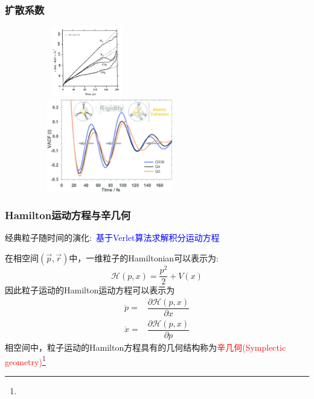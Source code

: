 \frame
{
	\frametitle{扩散系数}
\begin{figure}[h!]
\centering
\vspace*{-0.2in}
\includegraphics[height=1.2in,width=2.0in,viewport=0 0 350 300,clip]{Figures/MSD_O2-N2-CO2-CH4.png}\\
\includegraphics[height=1.6in,width=2.8in,viewport=0 0 230 160,clip]{Figures/The-velocity-autocorrelation-function-VACF-of-the-Al-atoms-showing-the-increase-of-rigidity of the local Al-coordination-for-G3-G4-and-G338-glasses.png}
\label{MSD-VACF}
\end{figure}
}


\begin{frame}
	\frametitle{\textrm{Hamilton}运动方程与辛几何}
	经典粒子随时间的演化:~\textcolor{blue}{基于\textrm{Verlet}算法求解积分运动方程}\\
	{\fontsize{7.2pt}{4.2pt}}

	在相空间$(\vec p,\vec r)$中，一维粒子的\textrm{Hamiltonian}可以表示为:
	\begin{displaymath}
		\mathcal{H}(p,x)=\dfrac{p^2}2+V(x)
	\end{displaymath}
	因此粒子运动的\textrm{Hamilton}运动方程可以表示为
	\begin{displaymath}
		\begin{aligned}
			\dot p=&\dfrac{\partial\mathcal{H}(p,x)}{\partial x}\\
			\dot x=&\dfrac{\partial\mathcal{H}(p,x)}{\partial p}
		\end{aligned}
	\end{displaymath}
	相空间中，粒子运动的\textrm{Hamilton}方程具有的几何结构称为\textcolor{red}{辛几何\textrm{(Symplectic geometry)\footnote{\fontsize{6.2pt}{4.2pt}}}}
\end{frame}

